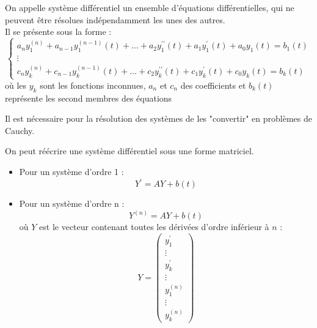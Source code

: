 \begin{defi}
On appelle système différentiel un ensemble d'équations différentielles, qui ne peuvent être résolues indépendamment les unes des autres.\\
Il se présente sous la forme :
$$\begin{cases}
a_n y_1^{(n)}+a_{n-1}y_1^{(n-1)}(t)+\hdots+a_2 y_1^{\prime\prime}(t)+a_1 y_1^{\prime}(t)+a_0y_1(t) = b_1(t)\\
\vdots \\
c_n y_k^{(n)} + c_{n-1}y_k^{(n-1)}(t)+\hdots+c_2 y_k^{\prime\prime}(t)+c_1 y_k^{\prime}(t)+c_0y_k(t) = b_k(t)
\end{cases}$$
où les $y_k$ sont les fonctions inconnues, $a_n$ et $c_n$ des coefficients et $b_k(t)$ représente les second membres des équations
\end{defi}
Il est nécessaire pour la résolution des systèmes de les "convertir" en problèmes de Cauchy.
\begin{prop}
On peut réécrire une système différentiel sous une forme matriciel.
\begin{itemize}
    \item Pour un système d'ordre  1 : $$Y^{\prime}=AY+b(t)$$
    \item Pour un système d'ordre n :$$Y^{(n)}=AY+b(t)$$
    où $Y$ est le vecteur contenant toutes les dérivées d'ordre inférieur à $n$ :
    $$Y=\begin{pmatrix}y_1^{\prime}\\\vdots\\y_k^{\prime}\\\vdots\\y_1^{(n)}\\\vdots\\y_k^{(n)}\end{pmatrix}$$
\end{itemize}
\end{prop}

